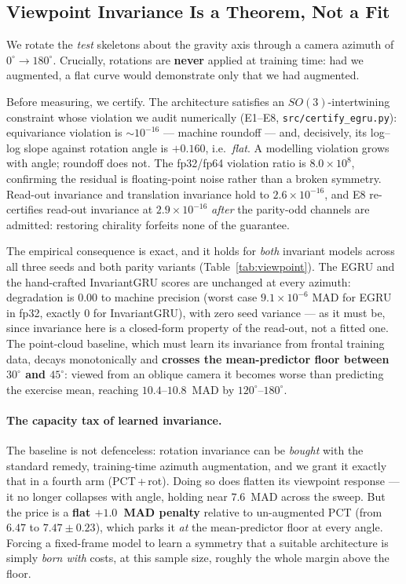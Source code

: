 \subsection{Viewpoint Invariance Is a Theorem, Not a Fit}
\label{sec:results:viewpoint}

We rotate the \emph{test} skeletons about the gravity axis through a camera azimuth of
$0^\circ\!\to\!180^\circ$. Crucially, rotations are \textbf{never} applied at training time: had we
augmented, a flat curve would demonstrate only that we had augmented.

Before measuring, we certify. The architecture satisfies an $SO(3)$-intertwining constraint whose
violation we audit numerically (E1--E8, \texttt{src/certify\_egru.py}): equivariance violation is
$\sim\!10^{-16}$ --- machine roundoff --- and, decisively, its log--log slope against rotation angle
is $+0.160$, i.e.\ \emph{flat}. A modelling violation grows with angle; roundoff does not. The
fp32/fp64 violation ratio is $8.0\times10^{8}$, confirming the residual is floating-point noise
rather than a broken symmetry. Read-out invariance and translation invariance hold to
$2.6\times10^{-16}$, and E8 re-certifies read-out invariance at $2.9\times10^{-16}$ \emph{after} the
parity-odd channels are admitted: restoring chirality forfeits none of the guarantee.

The empirical consequence is exact, and it holds for \emph{both} invariant models across all three
seeds and both parity variants (Table~\ref{tab:viewpoint}). The EGRU and the hand-crafted
InvariantGRU scores are unchanged at every azimuth: degradation is $0.00$ to machine precision
(worst case $9.1\times10^{-6}$ MAD for EGRU in fp32, exactly $0$ for InvariantGRU), with zero seed
variance --- as it must be, since invariance here is a closed-form property of the read-out, not a
fitted one. The point-cloud baseline, which must learn its invariance from frontal training data,
decays monotonically and \textbf{crosses the mean-predictor floor between $30^\circ$ and $45^\circ$}:
viewed from an oblique camera it becomes worse than predicting the exercise mean, reaching
$10.4$--$10.8$~MAD by $120^\circ$--$180^\circ$.

\paragraph{The capacity tax of learned invariance.} The baseline is not defenceless: rotation
invariance can be \emph{bought} with the standard remedy, training-time azimuth augmentation, and we
grant it exactly that in a fourth arm (PCT\,+\,rot). Doing so does flatten its viewpoint response ---
it no longer collapses with angle, holding near $7.6$~MAD across the sweep. But the price is a
\textbf{flat $+1.0$~MAD penalty} relative to un-augmented PCT (from $6.47$ to $7.47\pm0.23$), which
parks it \emph{at} the mean-predictor floor at every angle. Forcing a fixed-frame model to learn a
symmetry that a suitable architecture is simply \emph{born with} costs, at this sample size, roughly
the whole margin above the floor.

